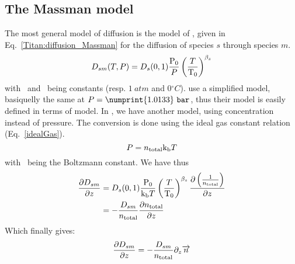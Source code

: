 \subsection{The Massman model}

The most general model of diffusion is the model of \citet{Massman1998}, given
in Eq.~\ref{Titan:diffusion_Massman} for the diffusion of species $s$ through
species $m$.
\begin{equation}
D_{sm}(T,P) = D_s(0,1) \frac{\mathrm{P_0}}{P}\left(\frac{T}{\mathrm{T_0}}\right)^{\beta_s}
\label{Titan:diffusion_Massman}
\end{equation}
with \Pz\ and \Tz\ being constants (resp. $1~\unit{atm}$ and $0\unit{^\circ C}$).
\citet{Wakeham1973} use a simplified model, basiquelly the same at $P=\numprint{1.0133}~\unit{bar}$, thus
their model is easily defined in terms of \citet{Massman1998} model. In \citet{WilsonPhD,Haye2005},
we have another model, using concentration instead of pressure. The conversion is done
using the ideal gas constant relation (Eq.~\ref{idealGas}).
\begin{equation}
P = n_\text{total}\text{k}_\text{b} T
\label{idealGas}
\end{equation}
with \kb\ being the Boltzmann constant.
We have thus
\begin{equation}
\begin{split}
\frac{\partial D_{sm}}{\partial z} & = D_s(0,1) \frac{\mathrm{P_0}}{\text{k}_\text{b} T}\left(\frac{T}{\mathrm{T_0}}\right)^{\beta_s} \frac{\partial\left(\frac{1}{n_\text{total}}\right)}{\partial z}\\
                     & = -\frac{D_{sm}}{n_\text{total}}\frac{\partial n_\text{total}}{\partial z}
\end{split}
\end{equation}
Which finally gives:
\begin{equation}
\frac{\partial D_{sm}}{\partial z}  = -\frac{D_{sm}}{n_\text{total}}\partial_{z}{\overrightarrow{n}}
\label{Titan:Massman_derive}
\end{equation}

